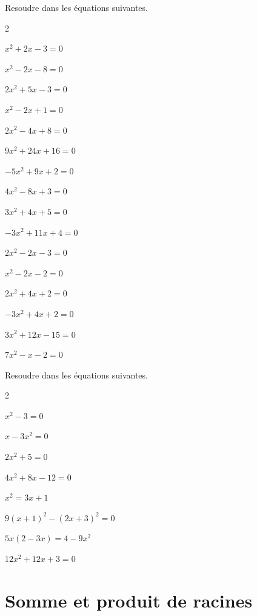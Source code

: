 \documentclass[11pt,a4paper]{article}  %
\begin{document}
Resoudre dans \R les équations suivantes.
\begin{multicols}{2}
\begin{enumMet}
	\item $x^2+2 x-3=0$
	\item $x^2-2 x-8=0$
	\item $2 x^2+5 x-3=0$
	\item $x^2-2 x+1=0$
	\item $2 x^2-4 x+8=0$
	\item $9 x^2+24 x+16=0$
	\item $-5 x^2+9 x+2=0$
	\item $4 x^2-8 x+3=0$
	\item $3 x^2+4 x+5=0$
	\item $-3 x^2+11 x+4=0$
	\item $2 x^2-2 x-3=0$
	\item $x^2-2 x-2=0$
	\item $2 x^2+4 x+2=0$
	\item $-3 x^2+4 x+2=0$
	\item $3 x^2+12 x-15=0$
	\item $7 x^2-x-2=0$
\end{enumMet}
\end{multicols}

Resoudre dans \R les équations suivantes.
\begin{multicols}{2}
	\begin{enumMet}
		\item $x^2-3=0$
		\item $x-3 x^2=0$
		\item $2 x^2+5=0$
		\item $4 x^2+8 x-12=0$
		\item $x^2=3 x+1$
		\item $9(x+1)^2-(2 x+3)^2=0$
		\item $5 x(2-3 x)=4-9 x^2$
		\item $12 x^2+12 x+3=0$
	\end{enumMet}
\end{multicols}

\section*{Somme et produit de racines}
\end{document}
